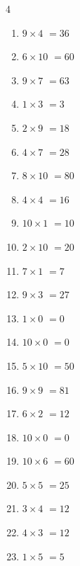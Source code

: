 \begin{multicols}{4}
\begin{enumerate}
  \item $9\times 4$
        $=36$

  \item $6\times 10$
        $=60$

  \item $9\times 7$
        $=63$

  \item $1\times 3$
        $=3$

  \item $2\times 9$
        $=18$

  \item $4\times 7$
        $=28$

  \item $8\times 10$
        $=80$

  \item $4\times 4$
        $=16$

  \item $10\times 1$
        $=10$

  \item $2\times 10$
        $=20$

\columnbreak %

  \item $7\times 1$
        $=7$

  \item $9\times 3$
        $=27$

  \item $1\times 0$
        $=0$

  \item $10\times 0$
        $=0$

  \item $5\times 10$
        $=50$

  \item $9\times 9$
        $=81$

  \item $6\times 2$
        $=12$

  \item $10\times 0$
        $=0$

  \item $10\times 6$
        $=60$

  \item $5\times 5$
        $=25$

  \item $3\times 4$
        $=12$

  \item $4\times 3$
        $=12$

  \item $1\times 5$
        $=5$


\end{enumerate}
\end{multicols}
